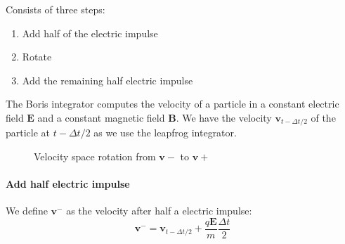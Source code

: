 \documentclass[a4paper]{report}
\newcommand*\V[1]{\bm{#1}}
\newcommand{\E}{\V{E}}
\newcommand{\B}{\V{B}}
\renewcommand*{\v}{\V{v}}
\newcommand{\dt}{\Delta t}
\begin{document}
Consists of three steps:
%
\begin{enumerate}
\item Add half of the electric impulse
\item Rotate
\item Add the remaining half electric impulse
\end{enumerate}
%
The Boris integrator computes the velocity of a particle in a constant electric 
field $\E$ and a constant magnetic field $\B$. We have the velocity 
$\v_{t-\Delta t/2}$ of the particle at $t-\Delta t/2$ as we use the leapfrog 
integrator.
%
\begin{figure}[h]
\centering
{}
\caption{Velocity space rotation from $\v-$ to $\v+$}
\end{figure}
%
\paragraph{Add half electric impulse} We define $\V{v^-}$ as the velocity after 
half a electric impulse:
$$\v^- = \v_{t-\dt/2} + \frac{q \E}{m} \frac{\dt}{2}$$
\end{document}
